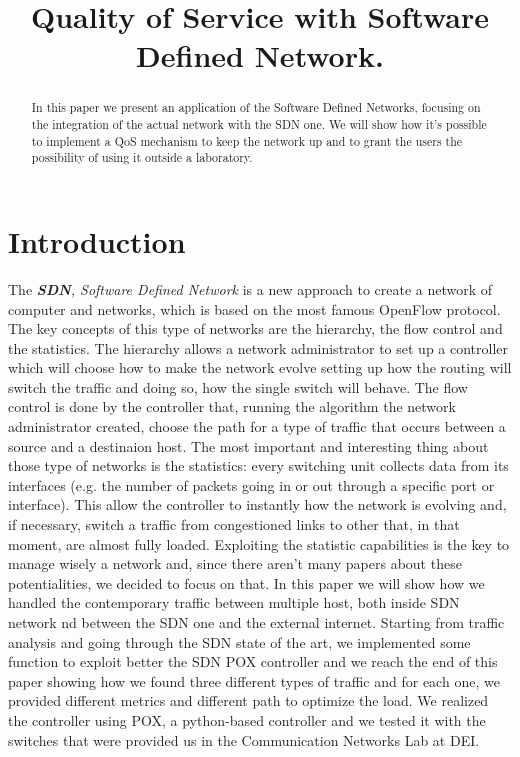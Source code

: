 \documentclass[conference,10pt]{IEEEtran}
\begin{document}
\title{Quality of Service with Software Defined Network.}

\author{
}

\maketitle

\begin{abstract}
In this paper we present an application of the Software Defined Networks, focusing on the integration of the actual network with the SDN one.
We will show how it's possible to implement a QoS mechanism to keep the network up and to grant the users the possibility of using it outside
a laboratory.
\end{abstract}

\section{Introduction}\label{sec:intro}
The \textit{\textbf{SDN}, Software Defined Network} is a new approach to create a network of computer and networks, which is based on the
most famous OpenFlow protocol. The key concepts of this type of networks are the hierarchy, the flow control and the statistics.
The hierarchy allows a network administrator to set up a controller which will choose how to make the network evolve setting up
how the routing will switch the traffic and doing so, how the single switch will behave.
The flow control is done by the controller that, running the algorithm the network administrator created, choose the path for a
type of traffic that occurs between a source and a destinaion host.
The most important and interesting thing about those type of networks is the statistics: every switching unit collects data from its
interfaces (e.g. the number of packets going in or out through a specific port or interface). This allow the controller to instantly
how the network is evolving and, if necessary, switch a traffic from congestioned links to other that, in that moment, are almost fully loaded.
Exploiting the statistic capabilities is the key to manage wisely a network and, since there aren't many papers about these potentialities,
we decided to focus on that. In this paper we will show how we handled the contemporary traffic between multiple host, both inside SDN network
nd between the SDN one and the external internet. Starting from traffic analysis and going through the SDN state of the art, we implemented some function
to exploit better the SDN POX controller and we reach the end of this paper showing how we found three different types of traffic and
for each one, we provided different metrics and different path to optimize the load. We realized the controller using POX, a python-based controller
and we tested it with the switches that were provided us in the Communication Networks Lab at DEI.
\end{document}
